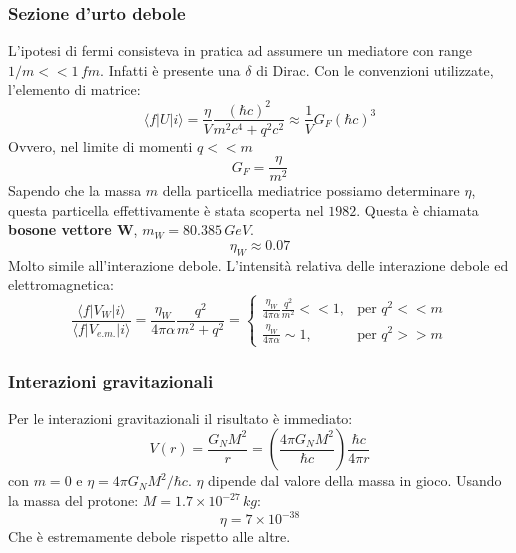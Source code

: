 \subsubsection{Sezione d'urto debole}
L'ipotesi di fermi consisteva in pratica ad assumere un mediatore con range $1/m<<1\,fm$. Infatti è presente una $\delta$ di Dirac. Con le convenzioni utilizzate, l'elemento di matrice:
\begin{equation*}
    \langle f|U|i\rangle=\frac{\eta}{V}\frac{(\hbar c)^2}{m^2c^4+q^2c^2}\approx\frac{1}{V}G_F(\hbar c)^3
\end{equation*}
Ovvero, nel limite di momenti $q<<m$
\begin{equation*}
    G_F=\frac{\eta}{m^2}
\end{equation*}
Sapendo che la massa $m$ della particella mediatrice possiamo determinare $\eta$, questa particella effettivamente è stata scoperta nel $1982$. Questa è chiamata \textbf{bosone vettore W}, $m_W=80.385\,GeV$.
\begin{equation*}
    \eta_W\approx0.07
\end{equation*}
Molto simile all'interazione debole. L'intensità relativa delle interazione debole ed elettromagnetica:
\begin{equation*}
    \frac{\langle f|V_W|i\rangle}{\langle f|V_{e.m.}|i\rangle}=\frac{\eta_W}{4\pi\alpha}\frac{q^2}{m^2+q^2}=\begin{cases} \frac{\eta_W}{4\pi\alpha}\frac{q^2}{m^2}<<1, & \mbox{per }q^2<<m \\ \frac{\eta_W}{4\pi\alpha}\sim1, & \mbox{per }q^2>>m
\end{cases}
\end{equation*}
\subsubsection{Interazioni gravitazionali}
Per le interazioni gravitazionali il risultato è immediato:
\begin{equation*}
    V(r)=\frac{G_NM^2}{r}=\left(\frac{4\pi G_NM^2}{\hbar c}\right)\frac{\hbar c}{4\pi r}
\end{equation*}
con $m=0$ e $\eta=4\pi G_NM^2/\hbar c$. $\eta$ dipende dal valore della massa in gioco. Usando la massa del protone: $M=1.7\times10^{-27}\,kg$:
\begin{equation*}
    \eta=7\times10^{-38}
\end{equation*}
Che è estremamente debole rispetto alle altre.